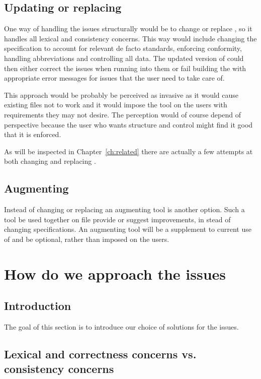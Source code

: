 \subsection{Updating or replacing {\bibtex}}

One way of handling the issues structurally would be to change or
replace {\bibtex}, so it handles all lexical and consistency concerns.
This way would include changing the {\bibtex} specification to account
for relevant de facto standards, enforcing conformity, handling
abbreviations and controlling all data.  The updated version of
{\bibtex} could then either correct the issues when running into them
or fail building the  with appropriate error messages for
issues that the user need to take care of.

This approach would be probably be perceived as invasive as it would
cause existing {\bibtex} files not to work and it would impose the
tool on the users with requirements they may not desire.  The
perception would of course depend of perspective because the user who
wants structure and control might find it good that it is enforced.

As will be inspected in Chapter~\ref{ch:related} there are actually a
few attempts at both changing and replacing {\bibtex}.


\subsection{Augmenting {\bibtex}}

Instead of changing or replacing {\bibtex} an augmenting tool is
another option.  Such a tool be used together on {\bibtex} file
provide or suggest improvements, in stead of changing specifications.
An augmenting tool will be a supplement to current use of {\bibtex}
and be optional, rather than imposed on the users.


\section{How do we approach the {\bibtex} issues}
\subsection{Introduction}

The goal of this section is to introduce our choice of solutions for
the issues.


\subsection{Lexical and correctness concerns vs. consistency concerns}
\label{sec:approach_lexical_consistency}

